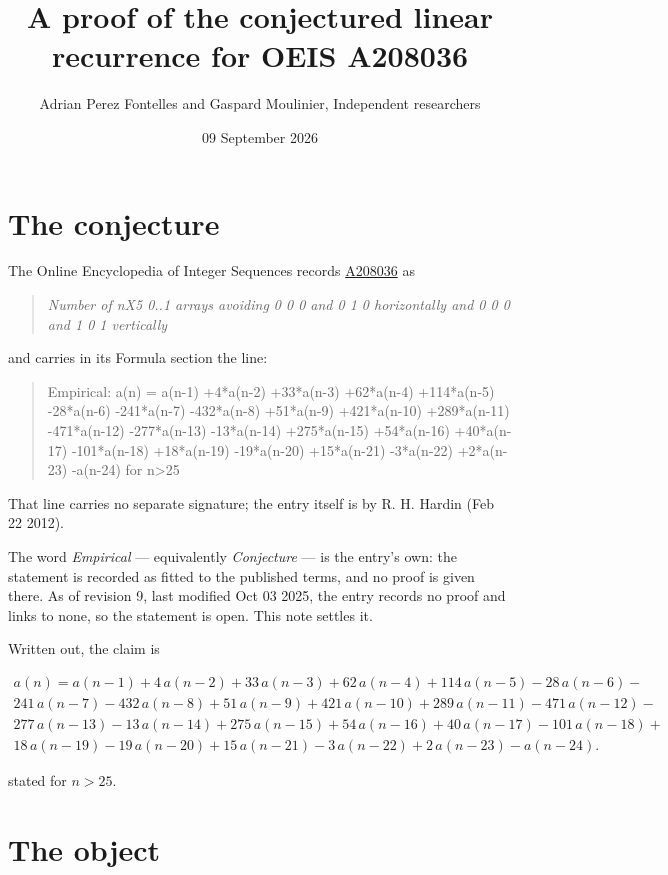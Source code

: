\documentclass[11pt]{article}
\title{A proof of the conjectured linear recurrence for OEIS A208036}
\author{Adrian Perez Fontelles and Gaspard Moulinier, Independent researchers}
\date{09 September 2026}
\theoremstyle{definition}
\begin{document}
\maketitle
\section{The conjecture}

The Online Encyclopedia of Integer Sequences records \href{https://oeis.org/A208036}{A208036} as

\begin{quote}\itshape Number of nX5 0..1 arrays avoiding 0 0 0 and 0 1 0 horizontally and 0 0 0 and 1 0 1 vertically\end{quote}

and carries in its Formula section the line:

\begin{quote}\ttfamily Empirical: a(n) = a(n-1) +4*a(n-2) +33*a(n-3) +62*a(n-4) +114*a(n-5) -28*a(n-6) -241*a(n-7) -432*a(n-8) +51*a(n-9) +421*a(n-10) +289*a(n-11) -471*a(n-12) -277*a(n-13) -13*a(n-14) +275*a(n-15) +54*a(n-16) +40*a(n-17) -101*a(n-18) +18*a(n-19) -19*a(n-20) +15*a(n-21) -3*a(n-22) +2*a(n-23) -a(n-24) for n>25\end{quote}

That line carries no separate signature; the entry itself is by R. H. Hardin (Feb 22 2012).

The word {\itshape Empirical} --- equivalently {\itshape Conjecture} --- is the entry's own: the statement is recorded as fitted to the published terms, and no proof is given there. As of revision 9, last modified Oct 03 2025, the entry records no proof and links to none, so the statement is open. This note settles it.

Written out, the claim is

\begin{multline*} a(n) = a(n-1) + 4\,a(n-2) + 33\,a(n-3) + 62\,a(n-4) + 114\,a(n-5) - 28\,a(n-6) - \\ 241\,a(n-7) - 432\,a(n-8) + 51\,a(n-9) + 421\,a(n-10) + 289\,a(n-11) - 471\,a(n-12) - \\ 277\,a(n-13) - 13\,a(n-14) + 275\,a(n-15) + 54\,a(n-16) + 40\,a(n-17) - 101\,a(n-18) + \\ 18\,a(n-19) - 19\,a(n-20) + 15\,a(n-21) - 3\,a(n-22) + 2\,a(n-23) - a(n-24). \end{multline*}

stated for $n > 25$.

\section{The object}
\end{document}
